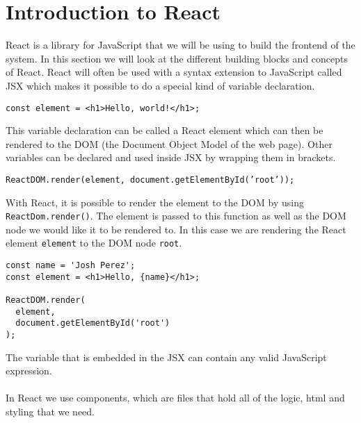 \section{Introduction to React}
React is a library for JavaScript that we will be using to build the frontend of the system.
In this section we will look at the different building blocks and concepts of React.
React will often be used with a syntax extension to JavaScript called JSX which makes it possible to do a special kind of variable declaration.

\begin{center}
    \texttt{const element = <h1>Hello, world!</h1>;}
\end{center}
This variable declaration can be called a React element which can then be rendered to the DOM (the Document Object Model of the web page).
Other variables can be declared and used inside JSX by wrapping them in brackets.
\begin{center}
    \texttt{ReactDOM.render(element, document.getElementById('root'));}
\end{center}
With React, it is possible to render the element to the DOM by using \texttt{ReactDom.render()}.
The element is passed to this function as well as the DOM node we would like it to be rendered to.
In this case we are rendering the React element \texttt{element} to the DOM node \texttt{root}.
\begin{lstlisting}
const name = 'Josh Perez';
const element = <h1>Hello, {name}</h1>;

ReactDOM.render(
  element,
  document.getElementById('root')
);
\end{lstlisting}
The variable that is embedded in the JSX can contain any valid JavaScript expression.
\\\\
In React we use components, which are files that hold all of the logic, html and styling that we need.

